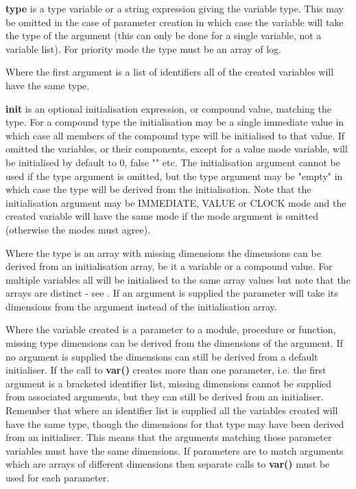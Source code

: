         {\bf type} is a type variable or a string expression giving the
        variable type. This may be omitted in the case of parameter
        creation in which case the variable will take the type of the
        argument (this can only be done for a single variable, not
        a variable list). For priority mode the type must be an array of log.
        
        Where the first argument is a list of identifiers all of the
        created variables will have the same type.
        
        {\bf init} is an optional initialisation expression, or compound
        value, matching the type. For a compound type the initialisation may
        be a single immediate value in which case all members of the compound
        type will be initialised to that value. If omitted the variables, or
        their components, except for a value mode variable, will be initialised
        by default to 0, false "" etc. The initialisation argument cannot be
        used if the type argument is omitted, but the type argument may be
        "empty" in which case the type will be derived from the initialisation.
        Note that the initialisation argument may be IMMEDIATE, VALUE or CLOCK
        mode and the created variable will have the same mode if the mode
        argument is omitted (otherwise the modes must agree).
        
        Where the type is an array with missing dimensions the dimensions
        can be derived from an initialisation array, be it a variable or
        a compound value. For multiple variables all will be initialised
        to the same array values but note that the arrays are distinct -
        see . If an argument is supplied the
        parameter will take its dimensions from the argument instead of the
        initialisation array.
        
        Where the variable created is a parameter to a module,
        procedure or function, missing type dimensions can be derived
        from the dimensions of the argument. If no argument is supplied
        the dimensions can still be derived from a default initialiser.
        If the call to {\bf var()} creates more than one parameter, i.e.
        the first argument is a bracketed identifier list, missing dimensions
        cannot be supplied from associated arguments, but they can still
        be derived from an initialiser. Remember that where an identifier
        list is supplied all the variables created will have the same type,
        though the dimensions for that type may have been derived from
        an initialiser. This means that the arguments matching those
        parameter variables must have the same dimensions. If parameters
        are to match arguments which are arrays of different dimensions then
        separate calls to {\bf var()} must be used for each parameter.
        
